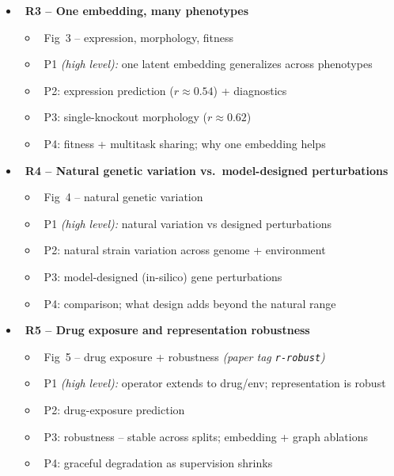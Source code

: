 \begin{itemize}
\begin{itemize}
    \item {}\ \textbf{R3 -- One embedding, many phenotypes}
      \begin{itemize}\setlength{\itemsep}{0pt}
        \item {}\ Fig~3 -- expression, morphology, fitness
        \item {}\ P1 \emph{(high level):} one latent embedding generalizes across phenotypes
        \item {}\ P2: expression prediction ($r{\approx}0.54$) + diagnostics
        \item {}\ P3: single-knockout morphology ($r{\approx}0.62$)
        \item {}\ P4: fitness + multitask sharing; why one embedding helps
      \end{itemize}

    \item {}\ \textbf{R4 -- Natural genetic variation vs.\ model-designed perturbations}
      \begin{itemize}\setlength{\itemsep}{0pt}
        \item {}\ Fig~4 -- natural genetic variation
        \item {}\ P1 \emph{(high level):} natural variation vs designed perturbations
        \item {}\ P2: natural strain variation across genome + environment
        \item {}\ P3: model-designed (in-silico) gene perturbations
        \item {}\ P4: comparison; what design adds beyond the natural range
      \end{itemize}

    \item {}\ \textbf{R5 -- Drug exposure and representation robustness}
      \begin{itemize}\setlength{\itemsep}{0pt}
        \item {}\ Fig~5 -- drug exposure + robustness \emph{(paper tag \texttt{r-robust})}
        \item {}\ P1 \emph{(high level):} operator extends to drug/env; representation is robust
        \item {}\ P2: drug-exposure prediction
        \item {}\ P3: robustness -- stable across splits; embedding + graph ablations
        \item {}\ P4: graceful degradation as supervision shrinks
      \end{itemize}


\end{itemize}
\end{itemize}
